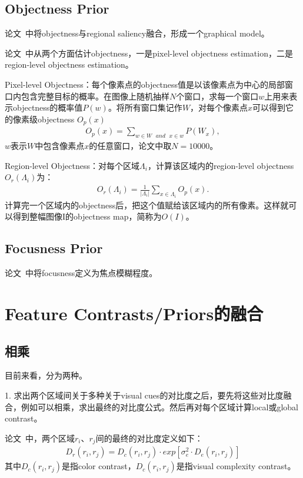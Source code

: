 \documentclass[12pt]{article}
\begin{document}
\subsection{Objectness Prior}

论文~\cite{chang2011fusing}中将objectness与regional saliency融合，形成一个graphical model。

论文~\cite{jiangpeng2013salient}中从两个方面估计objectness，一是pixel-level objectness estimation，二是region-level objectness estimation。

Pixel-level Objectness：每个像素点的objectness值是以该像素点为中心的局部窗口内包含完整目标的概率。在图像上随机抽样$N$个窗口，求每一个窗口$w$上用来表示objectness的概率值$P(w)$。将所有窗口集记作$W$，对每个像素点$x$可以得到它的像素级objectness $O_p(x)$
\begin{align}
O_p(x) = \sum_{w \in W \text{ }and \text{ } x \in w} P(W_x),
\end{align}
$w$表示$W$中包含像素点$x$的任意窗口，论文中取$N=10000$。

Region-level Objectness：对每个区域$\Lambda_i$，计算该区域内的region-level objectness $O_r(\Lambda_i)$为：
\begin{align}
O_r(\Lambda_i) = \frac{1}{|\Lambda_i|}\sum_{x \in \Lambda_i} O_p(x).
\end{align}
计算完一个区域内的objectness后，把这个值赋给该区域内的所有像素。这样就可以得到整幅图像I的objectness map，简称为$O(I)$。

\subsection{Focusness Prior}

论文~\cite{jiangpeng2013salient}中将focusness定义为焦点模糊程度。

\section{Feature Contrasts/Priors的融合}

\subsection{相乘}

目前来看，分为两种。

1. 求出两个区域间关于多种关于visual cues的对比度之后，要先将这些对比度融合，例如可以相乘，求出最终的对比度公式。然后再对每个区域计算local或global contrast。

论文~\cite{zhu2014tag}中，两个区域$r_i$、$r_j$间的最终的对比度定义如下：
\begin{align}
D_r(r_i, r_j) = D_c(r_i, r_j) \cdot exp[\sigma_e^2 \cdot D_e(r_i, r_j)]
\end{align}
其中$D_c(r_i, r_j)$是指color contrast，$D_c(r_i, r_j)$是指visual complexity contrast。
\end{document}

